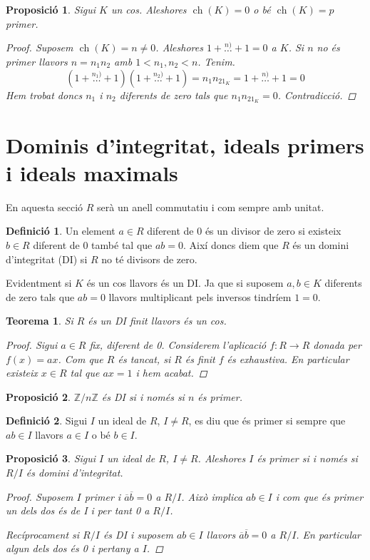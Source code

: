 \documentclass[a4paper,11pt]{report}
\newcommand{\zn}{\mathbb{Z}/n\mathbb{Z}}
\DeclareMathOperator{\ch}{ch}
\renewcommand{\bar}{\overline}
\theoremstyle{theorem}
\newtheorem{proposicio}{\normalfont \sffamily\bfseries Proposició}[section]
\newtheorem{teorema}{\normalfont \sffamily\bfseries Teorema}[section]
\theoremstyle{definition}
\newtheorem{definicio}{\normalfont\sffamily\bfseries Definició}[section]
\begin{document}
\begin{proposicio}
	Sigui $K$ un cos. Aleshores $\ch(K)=0$ o bé $\ch(K)=p$ primer.
	\begin{proof}
		Suposem $\ch(K)=n\neq0$. Aleshores $1+\stackrel{n)}\ldots+1=0$ a $K$. Si $n$ no és primer llavors $n=n_1n_2$ amb $1<n_1,n_2<n$. Tenim.$$(1+\stackrel{n_1)}\ldots+1)(1+\stackrel{n_2)}\ldots+1)=n_1n_21_K=1+\stackrel{n)}\ldots+1=0$$ Hem trobat doncs $n_1$ i $n_2$ diferents de zero tals que $n_1n_21_K=0$. Contradicció.
	\end{proof}
\end{proposicio}
\section{Dominis d'integritat, ideals primers i ideals maximals}
En aquesta secció $R$ serà un anell commutatiu i com sempre amb unitat.
\begin{definicio}
	Un element $a\in R$ diferent de 0 és un divisor de zero si existeix $b\in R$ diferent de 0 també tal que $ab=0$. Així doncs diem que $R$ és un domini d'integritat (DI) si $R$ no té divisors de zero.
\end{definicio}
Evidentment si $K$ és un cos llavors és un DI. Ja que si suposem $a,b\in K$ diferents de zero tals que $ab=0$ llavors multiplicant pels inversos tindríem $1=0$.
\begin{teorema}
	Si $R$ és un DI finit llavors és un cos.
	\begin{proof}
		Sigui $a\in R$ fix, diferent de 0. Considerem l'aplicació $f:R\longrightarrow R$ donada per $f(x)=ax$. Com que $R$ és tancat, si $R$ és finit $f$ és exhaustiva. En particular existeix $x\in R$ tal que $ax=1$ i hem acabat.
	\end{proof}
\end{teorema}
\begin{proposicio}
	$\zn$ és DI si i només si $n$ és primer.
\end{proposicio}
\begin{definicio}
	Sigui $I$ un ideal de $R$, $I\neq R$, es diu que és primer si sempre que $ab\in I$ llavors $a\in I$ o bé $b\in I$.
\end{definicio}
\begin{proposicio}
	Sigui $I$ un ideal de $R$, $I\neq R$. Aleshores $I$ és primer si i només si $R/I$ és domini d'integritat.
	\begin{proof}
		Suposem $I$ primer i $\bar{a}\bar{b}=0$ a $R/I$. Això implica $ab\in I$ i com que és primer un dels dos és de I i per tant 0 a $R/I$.
		
		Recíprocament si $R/I$ és DI i suposem $ab\in I$ llavors $\bar{a}\bar{b}=0$ a $R/I$. En particular algun dels dos és 0 i pertany a $I$.
	\end{proof}

\end{proposicio}
\end{document}
